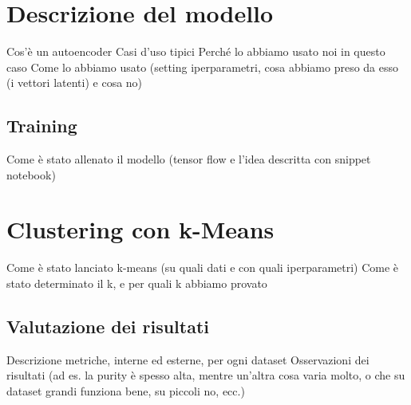 \section{Descrizione del modello}
Cos'è un autoencoder
Casi d'uso tipici
Perché lo abbiamo usato noi in questo caso
Come lo abbiamo usato (setting iperparametri, cosa abbiamo preso da esso (i vettori latenti) e cosa no)

\subsection{Training}
Come è stato allenato il modello (tensor flow e l'idea descritta con snippet notebook)

\section{Clustering con k-Means}
Come è stato lanciato k-means (su quali dati e con quali iperparametri)
Come è stato determinato il k, e per quali k abbiamo provato

\subsection{Valutazione dei risultati}
Descrizione metriche, interne ed esterne, per ogni dataset
Osservazioni dei risultati (ad es. la purity è spesso alta, mentre un'altra cosa varia molto, o che su dataset grandi funziona bene, su piccoli no, ecc.)
